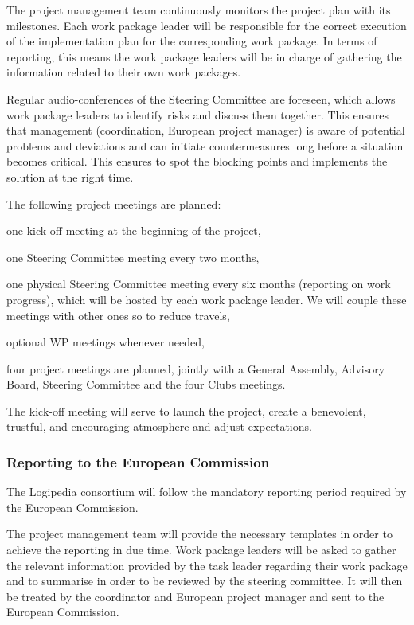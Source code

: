 The project management team continuously monitors the project plan
with its milestones. Each work package leader will be
responsible for the correct execution of the implementation plan for
the corresponding work package. In terms of reporting, this means the work package leaders
will be in charge of gathering the information related to their own
work packages.

Regular audio-conferences of the Steering Committee are foreseen,
which allows work package leaders to identify risks and
discuss them together. This ensures that management (coordination,
European project manager) is aware of potential problems and
deviations and can initiate countermeasures long before a situation
becomes critical. This ensures to spot the blocking points and implements
the solution at the right time.

The following project meetings are planned:

\begin{compactitem}
\item one kick-off meeting at the beginning of the project, 
\item one Steering Committee meeting every two months,
\item one physical Steering Committee meeting every six months
  (reporting on work progress), which will be hosted by each work package 
  leader. We will couple these meetings with other ones so to reduce
  travels,
\item optional WP meetings whenever needed, 
\item four project meetings are planned, jointly with a General Assembly,
  Advisory Board, Steering Committee and the four Clubs meetings.
\end{compactitem}

The kick-off meeting will serve to launch the project, create a
benevolent, trustful, and encouraging atmosphere and adjust
expectations.

\subsubsection*{Reporting to the European Commission}

The Logipedia consortium will follow the mandatory reporting period
required by the European Commission. 

The project management team will provide the necessary templates in
order to achieve the reporting in due time. Work package leaders will
be asked to gather the relevant information provided by the task
leader regarding their work package and to summarise in order to be
reviewed by the steering committee. It will then be treated by the
coordinator and European project manager and sent to the
European Commission.

